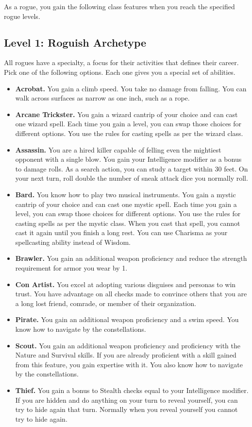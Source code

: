 \documentclass[12pt,letterpaper,twocolumn,openany,nodeprecatedcode,bg=none]{dndbook}
\providecommand{\tightlist}{%
  \setlength{\itemsep}{0pt}\setlength{\parskip}{0pt}}
\begin{document}
As a rogue, you gain the following class features when you reach the
specified rogue levels.

\subsection{Level 1: Roguish Archetype}\label{level-1-roguish-archetype}

All rogues have a specialty, a focus for their activities that defines
their career. Pick one of the following options. Each one gives you a
special set of abilities.

\begin{itemize}
\tightlist
\item
  \textbf{Acrobat.} You gain a climb speed. You take no damage from
  falling. You can walk across surfaces as narrow as one inch, such as a
  rope.
\item
  \textbf{Arcane Trickster.} You gain a wizard cantrip of your choice
  and can cast one wizard spell. Each time you gain a level, you can
  swap those choices for different options. You use the rules for
  casting spells as per the wizard class.
\item
  \textbf{Assassin.} You are a hired killer capable of felling even the
  mightiest opponent with a single blow. You gain your Intelligence
  modifier as a bonus to damage rolls. As a search action, you can study
  a target within 30 feet. On your next turn, roll double the number of
  sneak attack dice you normally roll.
\item
  \textbf{Bard.} You know how to play two musical instruments. You gain
  a mystic cantrip of your choice and can cast one mystic spell. Each
  time you gain a level, you can swap those choices for different
  options. You use the rules for casting spells as per the mystic class.
  When you cast that spell, you cannot cast it again until you finish a
  long rest. You can use Charisma as your spellcasting ability instead
  of Wisdom.
\item
  \textbf{Brawler.} You gain an additional weapon proficiency and reduce
  the strength requirement for armor you wear by 1.
\item
  \textbf{Con Artist.} You excel at adopting various disguises and
  personas to win trust. You have advantage on all checks made to
  convince others that you are a long lost friend, comrade, or member of
  their organization.
\item
  \textbf{Pirate.} You gain an additional weapon proficiency and a swim
  speed. You know how to navigate by the constellations.
\item
  \textbf{Scout.} You gain an additional weapon proficiency and
  proficiency with the Nature and Survival skills. If you are already
  proficient with a skill gained from this feature, you gain expertise
  with it. You also know how to navigate by the constellations.
\item
  \textbf{Thief.} You gain a bonus to Stealth checks equal to your
  Intelligence modifier. If you are hidden and do anything on your turn
  to reveal yourself, you can try to hide again that turn. Normally when
  you reveal yourself you cannot try to hide again.
\end{itemize}
\end{document}
